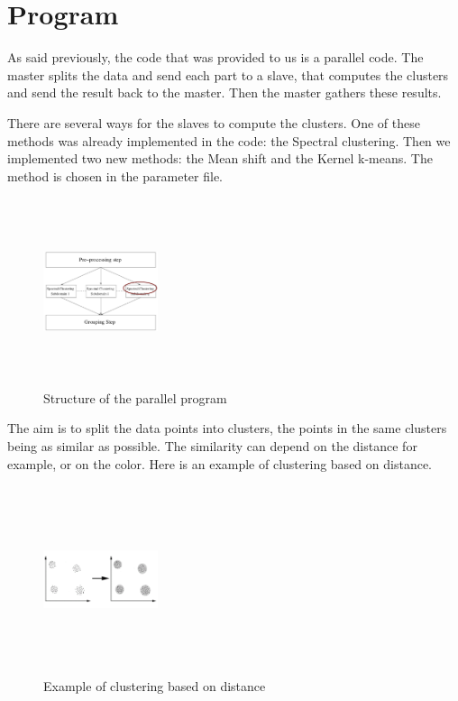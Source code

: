 \section{Program}
As said previously, the code that was provided to us is a parallel code. The master splits the data and send each part to a slave, that computes the clusters and send the result back to the master. Then the master gathers these results.

There are several ways for the slaves to compute the clusters. One of these methods was already implemented in the code: the Spectral clustering. Then we implemented two new methods: the Mean shift and the Kernel k-means. The method is chosen in the parameter file.
\begin{center}
\begin{figure}[h!]
\includegraphics[width=0.3\textwidth, height=5.5cm]{Image/parallel2.png}
\caption{Structure of the parallel program}
\end{figure}
\end{center}

The aim is to split the data points into clusters, the points in the same clusters being as similar as possible. The similarity can depend on the distance for example, or on the color. Here is an example of clustering based on distance.
\begin{center}
\begin{figure}[h!]
\includegraphics[width=0.3\textwidth, height=5.5cm]{Image/clust.png}
\caption{Example of clustering based on distance}
\end{figure}
\end{center}
